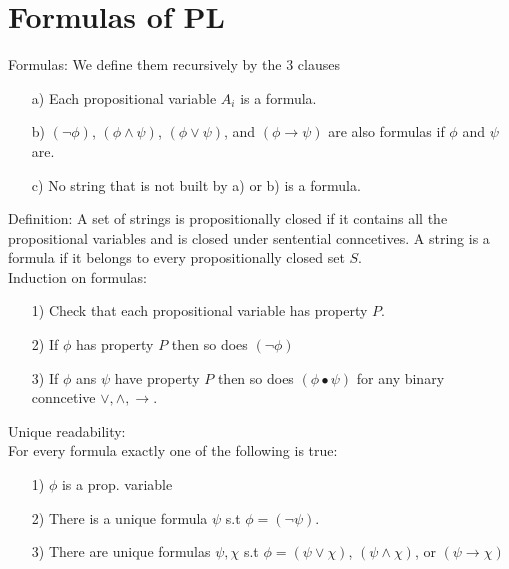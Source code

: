 \documentclass[10pt]{article}
\begin{document}
\section*{Formulas of PL}
Formulas: We define them recursively by the $3$ clauses
\begin{itemize}
    \item [a)] Each propositional variable $A_i$ is a formula.
    \item [b)] $(\lnot\phi)$, $(\phi\land\psi)$, $(\phi\lor\psi)$, and $(\phi\rightarrow\psi)$ are also formulas if $\phi$ and $\psi$ are.
    \item [c)] No string that is not built by a) or b) is a formula. 
\end{itemize}
Definition: A set of strings is propositionally closed if it contains all the propositional variables and is closed under sentential conncetives. A string is a formula if it belongs to every propositionally closed set $S$.\\
Induction on formulas:
\begin{itemize}
    \item [1)] Check that each propositional variable has property $P$.
    \item [2)] If $\phi$ has property $P$ then so does $(\lnot\phi)$
    \item [3)] If $\phi$ ans $\psi$ have property $P$ then so does $(\phi\bullet\psi)$ for any binary conncetive $\lor,\land,\rightarrow$.
\end{itemize}
Unique readability:\\
For every formula exactly one of the following is true:
\begin{itemize}
    \item [1)] $\phi$ is a prop. variable
    \item [2)] There is a unique formula $\psi$ s.t $\phi=(\lnot\psi)$.
    \item [3)] There are unique formulas $\psi,\chi$ s.t $\phi=(\psi\lor\chi)$, $(\psi\land\chi)$, or $(\psi\rightarrow\chi)$
\end{itemize}
\end{document}
